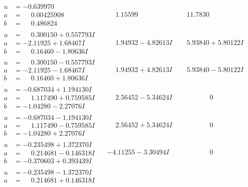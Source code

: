 \documentclass[1p]{elsarticle_modified}
\theoremstyle{definition}
\begin{document}
$$\begin{array}{c|c|c}
\begin{aligned}
u &= -0.639970\phantom{ +0.000000I} \\
a &= \phantom{-}0.00425908\phantom{ +0.000000I} \\
b &= \phantom{-}0.486824\phantom{ +0.000000I}\end{aligned}
 & \phantom{-}1.15599\phantom{ +0.000000I} & \phantom{-}11.7830\phantom{ +0.000000I} \\ \hline\begin{aligned}
u &= \phantom{-}0.300150 + 0.557793 I \\
a &= -2.11925 + 1.68467 I \\
b &= \phantom{-}0.16460 - 1.80636 I\end{aligned}
 & \phantom{-}1.94932 - 4.82613 I & \phantom{-}5.93840 + 5.80122 I \\ \hline\begin{aligned}
u &= \phantom{-}0.300150 - 0.557793 I \\
a &= -2.11925 - 1.68467 I \\
b &= \phantom{-}0.16460 + 1.80636 I\end{aligned}
 & \phantom{-}1.94932 + 4.82613 I & \phantom{-}5.93840 - 5.80122 I \\ \hline\begin{aligned}
u &= -0.687034 + 1.194130 I \\
a &= \phantom{-}1.117490 + 0.759585 I \\
b &= -1.04280 - 2.27076 I\end{aligned}
 & \phantom{-}2.56452 - 5.34624 I & \phantom{-0.000000 } 0 \\ \hline\begin{aligned}
u &= -0.687034 - 1.194130 I \\
a &= \phantom{-}1.117490 - 0.759585 I \\
b &= -1.04280 + 2.27076 I\end{aligned}
 & \phantom{-}2.56452 + 5.34624 I & \phantom{-0.000000 } 0 \\ \hline\begin{aligned}
u &= -0.235498 + 1.372370 I \\
a &= \phantom{-}0.214681 - 0.146318 I \\
b &= -0.370603 + 0.393439 I\end{aligned}
 & -4.11255 - 3.30494 I & \phantom{-0.000000 } 0 \\ \hline\begin{aligned}
u &= -0.235498 - 1.372370 I \\
a &= \phantom{-}0.214681 + 0.146318 I \\

\end{aligned}
\end{array}$$
\end{document}
